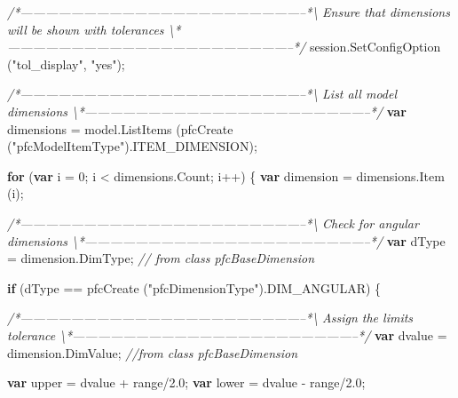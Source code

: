 \documentclass[]{article}
\newenvironment{Shaded}{}{}
\newcommand{\KeywordTok}[1]{\textcolor[rgb]{0.00,0.44,0.13}{\textbf{{#1}}}}
\newcommand{\DecValTok}[1]{\textcolor[rgb]{0.25,0.63,0.44}{{#1}}}
\newcommand{\FloatTok}[1]{\textcolor[rgb]{0.25,0.63,0.44}{{#1}}}
\newcommand{\StringTok}[1]{\textcolor[rgb]{0.25,0.44,0.63}{{#1}}}
\newcommand{\CommentTok}[1]{\textcolor[rgb]{0.38,0.63,0.69}{\textit{{#1}}}}
\newcommand{\OtherTok}[1]{\textcolor[rgb]{0.00,0.44,0.13}{{#1}}}
\newcommand{\FunctionTok}[1]{\textcolor[rgb]{0.02,0.16,0.49}{{#1}}}
\newcommand{\NormalTok}[1]{{#1}}
\begin{document}
\begin{Shaded}
\begin{Highlighting}[]
            
 \CommentTok{/*--------------------------------------------------------------------*\textbackslash{} }
\CommentTok{   Ensure that dimensions will be shown with tolerances }
\CommentTok{ \textbackslash{}*--------------------------------------------------------------------*/}  
  \OtherTok{session}\NormalTok{.}\FunctionTok{SetConfigOption} \NormalTok{(}\StringTok{"tol_display"}\NormalTok{, }\StringTok{"yes"}\NormalTok{);}
    
 \CommentTok{/*--------------------------------------------------------------------*\textbackslash{} }
\CommentTok{   List all model dimensions}
\CommentTok{ \textbackslash{}*--------------------------------------------------------------------*/}  
  \KeywordTok{var} \NormalTok{dimensions = }\OtherTok{model}\NormalTok{.}\FunctionTok{ListItems} \NormalTok{(}\FunctionTok{pfcCreate} \NormalTok{(}\StringTok{"pfcModelItemType"}\NormalTok{).}\FunctionTok{ITEM_DIMENSION}\NormalTok{);}
  
  \KeywordTok{for} \NormalTok{(}\KeywordTok{var} \NormalTok{i = }\DecValTok{0}\NormalTok{;  i < }\OtherTok{dimensions}\NormalTok{.}\FunctionTok{Count}\NormalTok{; i++)}
    \NormalTok{\{}
      \KeywordTok{var} \NormalTok{dimension = }\OtherTok{dimensions}\NormalTok{.}\FunctionTok{Item} \NormalTok{(i);}

 \CommentTok{/*--------------------------------------------------------------------*\textbackslash{} }
\CommentTok{   Check for angular dimensions}
\CommentTok{ \textbackslash{}*--------------------------------------------------------------------*/}  
      \KeywordTok{var} \NormalTok{dType = }\OtherTok{dimension}\NormalTok{.}\FunctionTok{DimType}\NormalTok{;  }\CommentTok{// from class pfcBaseDimension}
      
      
      \KeywordTok{if} \NormalTok{(dType == }\FunctionTok{pfcCreate} \NormalTok{(}\StringTok{"pfcDimensionType"}\NormalTok{).}\FunctionTok{DIM_ANGULAR}\NormalTok{)}
    \NormalTok{\{}
      
 \CommentTok{/*--------------------------------------------------------------------*\textbackslash{} }
\CommentTok{   Assign the limits tolerance }
\CommentTok{ \textbackslash{}*--------------------------------------------------------------------*/}  
      \KeywordTok{var} \NormalTok{dvalue = }\OtherTok{dimension}\NormalTok{.}\FunctionTok{DimValue}\NormalTok{;  }\CommentTok{//from class pfcBaseDimension}
      
      \KeywordTok{var} \NormalTok{upper = dvalue + range/}\FloatTok{2.0}\NormalTok{;}
      \KeywordTok{var} \NormalTok{lower = dvalue - range/}\FloatTok{2.0}\NormalTok{;}
      

\end{Highlighting}
\end{Shaded}
\end{document}
